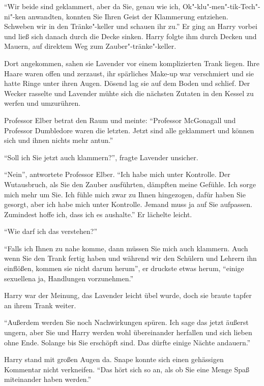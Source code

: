 \enquote{Wir beide sind geklammert, aber da Sie, genau wie ich, Ok"-klu"-men"-tik-Tech"-ni"-ken anwandten, konnten Sie Ihren Geist der Klammerung entziehen. Schweben wir in den Tränke"-keller und schauen ihr zu.} Er ging an Harry vorbei und ließ sich danach durch die Decke sinken. Harry folgte ihm durch Decken und Mauern, auf direktem Weg zum Zauber"-tränke"-keller.

Dort angekommen, sahen sie Lavender vor einem komplizierten Trank liegen. Ihre Haare waren offen und zerzaust, ihr spärliches Make-up war verschmiert und sie hatte Ringe unter ihren Augen. Dösend lag sie auf dem Boden und schlief. Der Wecker rasselte und Lavender mühte sich die nächsten Zutaten in den Kessel zu werfen und umzurühren.

Professor Elber betrat den Raum und meinte: \enquote{Professor McGonagall und Professor Dumbledore waren die letzten. Jetzt sind alle geklammert und können sich und ihnen nichts mehr antun.}

\enquote{Soll ich Sie jetzt auch klammern?}, fragte Lavender unsicher.

\enquote{Nein}, antwortete Professor Elber. \enquote{Ich habe mich unter Kontrolle. Der Wutausbruch, als Sie den Zauber ausführten, dämpften meine Gefühle. Ich sorge mich mehr um Sie. Ich fühle mich zwar zu Ihnen hingezogen, dafür haben Sie gesorgt, aber ich habe mich unter Kontrolle. Jemand muss ja auf Sie aufpassen. \gst Zumindest hoffe ich, dass ich es aushalte.} Er lächelte leicht.

\enquote{Wie darf ich das verstehen?}

\enquote{Falls ich Ihnen zu nahe komme, dann müssen Sie mich auch klammern. \gst Auch wenn Sie den Trank fertig haben und während wir den Schülern und Lehrern ihn einflößen, kommen sie nicht darum herum\abs}, er druckste etwas herum, \enquote{einige sexuelle\abs na ja, Handlungen vorzunehmen.}

Harry war der Meinung, das Lavender leicht übel wurde, doch sie braute tapfer an ihrem Trank weiter.

\enquote{Außerdem werden Sie noch Nachwirkungen spüren. Ich sage das jetzt äußerst ungern, aber Sie und Harry werden wohl übereinander herfallen und sich lieben ohne Ende. Solange bis Sie erschöpft sind. Das dürfte einige Nächte andauern.}

Harry stand mit großen Augen da. Snape konnte sich einen gehässigen Kommentar nicht verkneifen. \enquote{Das hört sich so an, als ob Sie eine Menge Spaß miteinander haben werden.}

